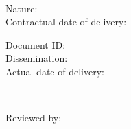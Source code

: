 \begin{center}
\begin{minipage}[t]{0.5\linewidth}
\begin{flushleft}
	\cmdWpNumber{} \cmdWpName{}\\
	Nature: {\color{prowessred} \cmdDlNature{}}\\
	Contractual date of delivery: {\color{prowessred} \cmdDlContractDate{}}\\
\end{flushleft}
\end{minipage}
\begin{minipage}[t]{0.49\linewidth}
	\begin{flushleft}
		Document ID: {\color{prowessred} \cmdDlDocumentId{}}\\
		Dissemination: {\color{prowessred} \cmdDlDissemination{}}\\
		Actual date of delivery: {\color{prowessred} \cmdDlActualDate{}}\\
	\end{flushleft}
\end{minipage}\\[0.3cm]
\begin{flushleft}
Reviewed by: {\color{prowessred} \cmdDlReviewerName{}}\\
\end{flushleft}

\end{center}

\clearpage

